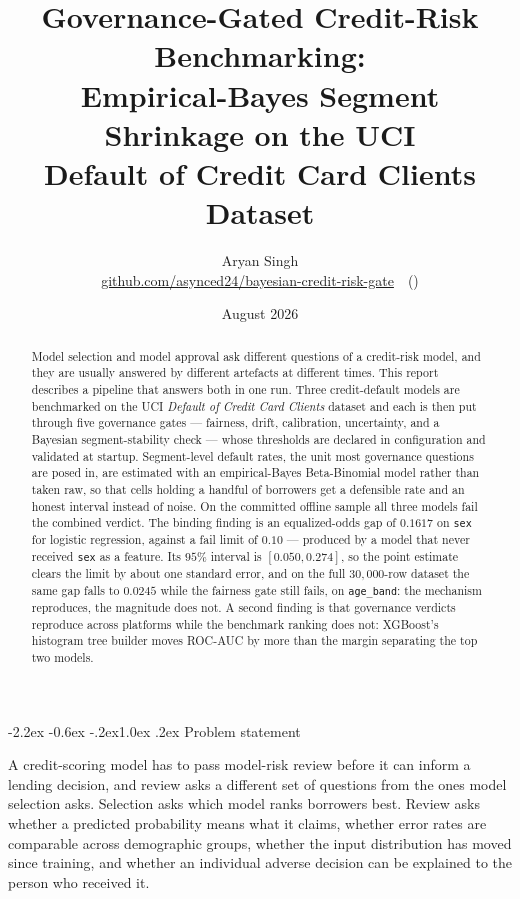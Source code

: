 \documentclass[10pt,a4paper]{article}
\title{\vspace{-1.2cm}\textbf{Governance-Gated Credit-Risk Benchmarking:\\
Empirical-Bayes Segment Shrinkage on the UCI\\
Default of Credit Card Clients Dataset}}
\author{Aryan Singh\\
\small\href{https://github.com/asynced24/bayesian-credit-risk-gate}%
{github.com/asynced24/bayesian-credit-risk-gate}\ \ (\code{v1.0.0})}
\date{August 2026}
\makeatletter
\renewcommand\section{\@startsection{section}{1}{\z@}%
  {-2.2ex \@plus -0.6ex \@minus -.2ex}{1.0ex \@plus .2ex}%
  {\normalfont\large\bfseries}}
\newcommand{\code}[1]{\texttt{\small #1}}
\makeatother
\begin{document}
\maketitle

\begin{abstract}
\noindent
Model selection and model approval ask different questions of a credit-risk
model, and they are usually answered by different artefacts at different times.
This report describes a pipeline that answers both in one run. Three
credit-default models are benchmarked on the UCI \emph{Default of Credit Card
Clients} dataset and each is then put through five governance gates --- fairness,
drift, calibration, uncertainty, and a Bayesian segment-stability check --- whose
thresholds are declared in configuration and validated at startup. Segment-level
default rates, the unit most governance questions are posed in, are estimated
with an empirical-Bayes Beta-Binomial model rather than taken raw, so that cells
holding a handful of borrowers get a defensible rate and an honest interval
instead of noise. On the committed offline sample all three models fail the
combined verdict. The binding finding is an equalized-odds gap of $0.1617$ on
\code{sex} for logistic regression, against a fail limit of $0.10$ --- produced by
a model that never received \code{sex} as a feature. Its $95\%$ interval is
$[0.050, 0.274]$, so the point estimate clears the limit by about one standard
error, and on the full $30{,}000$-row dataset the same gap falls to $0.0245$ while
the fairness gate still fails, on \code{age\_band}: the mechanism reproduces, the
magnitude does not. A second finding is that governance verdicts reproduce across
platforms while the benchmark ranking does not: XGBoost's histogram tree builder
moves ROC-AUC by more than the margin separating the top two models.
\end{abstract}

\section{Problem statement}

A credit-scoring model has to pass model-risk review before it can inform a
lending decision, and review asks a different set of questions from the ones
model selection asks. Selection asks which model ranks borrowers best. Review
asks whether a predicted probability means what it claims, whether error rates
are comparable across demographic groups, whether the input distribution has
moved since training, and whether an individual adverse decision can be
explained to the person who received it.
\end{document}
